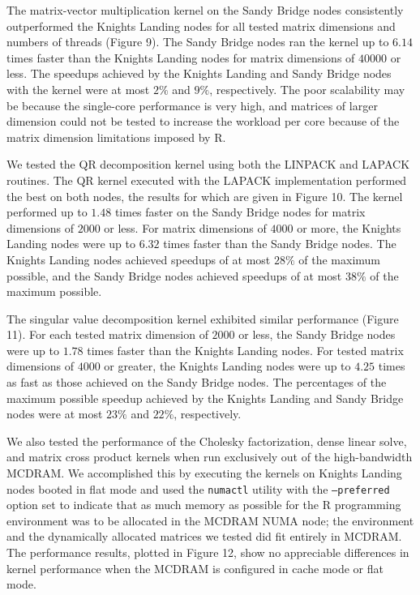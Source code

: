The matrix-vector multiplication kernel on the Sandy Bridge nodes consistently
  outperformed the Knights Landing nodes for all tested matrix dimensions and
  numbers of threads (Figure 9).
The Sandy Bridge nodes ran the kernel up to $6.14$ times faster than the
  Knights Landing nodes for matrix dimensions of $40000$ or less.
The speedups achieved by the Knights Landing and Sandy Bridge nodes with the
  kernel were at most $2\%$ and $9\%$, respectively.
The poor scalability may be because the single-core performance is very high,
  and matrices of larger dimension could not be tested to increase the workload
  per core because of the matrix dimension limitations imposed by R.

We tested the QR decomposition kernel using both the LINPACK and LAPACK
  routines.
The QR kernel executed with the LAPACK implementation performed the best on both
  nodes, the results for which are given in Figure 10.
The kernel performed up to $1.48$ times faster on the Sandy Bridge nodes for
  matrix dimensions of $2000$ or less.
For matrix dimensions of $4000$ or more, the Knights Landing nodes were up to
  $6.32$ times faster than the Sandy Bridge nodes.
The Knights Landing nodes achieved speedups of at most $28\%$ of the maximum
  possible, and the Sandy Bridge nodes achieved speedups of at most $38\%$ of
  the maximum possible.

The singular value decomposition kernel exhibited similar performance
  (Figure 11).
For each tested matrix dimension of $2000$ or less, the Sandy Bridge nodes were
  up to $1.78$ times faster than the Knights Landing nodes.
For tested matrix dimensions of $4000$ or greater, the Knights Landing nodes
  were up to $4.25$ times as fast as those achieved on the Sandy Bridge nodes.
The percentages of the maximum possible speedup achieved by the Knights Landing
  and Sandy Bridge nodes were at most $23\%$ and $22\%$, respectively.

We also tested the performance of the Cholesky factorization, dense linear
  solve, and matrix cross product kernels when run exclusively out of the
  high-bandwidth MCDRAM.
We accomplished this by executing the kernels on Knights Landing nodes booted in
  flat mode and used the \texttt{numactl} utility with the \texttt{--preferred} option
  set to indicate that as much memory as possible for the R programming
  environment was to be allocated in the MCDRAM NUMA node; the environment and
  the dynamically allocated matrices we tested did fit entirely in MCDRAM.
The performance results, plotted in Figure 12, show no appreciable differences
  in kernel performance when the MCDRAM is configured in cache mode or flat
  mode.

